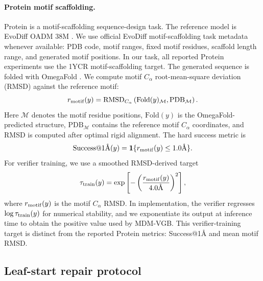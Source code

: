 \documentclass{article}
\numberwithin{theorem}{section}
\numberwithin{proposition}{section}
\numberwithin{corollary}{section}
\numberwithin{lemma}{section}
\numberwithin{conjecture}{section}
\numberwithin{remark}{section}
\numberwithin{definition}{section}
\numberwithin{assumption}{section}
\numberwithin{example}{section}
\begin{document}
\paragraph{Protein motif scaffolding.}
Protein is a motif-scaffolding sequence-design task. The reference model is EvoDiff OADM 38M \citep{alamdari2023protein}. We use official EvoDiff motif-scaffolding task metadata whenever available: PDB code, motif ranges, fixed motif residues, scaffold length range, and generated motif positions. In our task, all reported Protein experiments use the 1YCR motif-scaffolding target. The generated sequence is folded with OmegaFold \citep{wu2022omegafold}. We compute motif \(C_\alpha\) root-mean-square deviation (RMSD) against the reference motif:
\begin{equation*}
r_{\rm motif}(y) =
    \mathrm{RMSD}_{C_\alpha}
    \left(
        \mathrm{Fold}(y)_{\mathcal M},
        \mathrm{PDB}_{\mathcal M}
    \right).
\end{equation*}
Here $\mathcal M$ denotes the motif residue positions, $\mathrm{Fold}(y)$ is the OmegaFold-predicted structure, $\mathrm{PDB}_{\mathcal M}$ contains the reference motif $C_\alpha$ coordinates, and RMSD is computed after optimal rigid alignment.
The hard success metric is
\begin{equation*}
    \text{Success@1\AA{}}(y)
=
    \mathbf 1\{r_{\rm motif}(y)\le 1.0\text{\AA}\}.
\end{equation*}
For verifier training, we use a smoothed RMSD-derived target
\begin{equation*}
    \tau_{\rm train}(y)
    =
    \exp\left[
    -\left(
    \frac{r_{\rm motif}(y)}{4.0\text{\AA}}
    \right)^2
    \right],
\end{equation*}
where \(r_{\rm motif}(y)\) is the motif \(C_\alpha\) RMSD. In implementation, the verifier regresses \(\log \tau_{\rm train}(y)\) for numerical stability, and we exponentiate its output at inference time to obtain the positive value used by MDM-VGB. This verifier-training target is distinct from the reported Protein metrics: Success@1\AA{} and mean motif RMSD.

\subsection{Leaf-start repair protocol}
\label{app:root_leaf_protocols}
\end{document}
